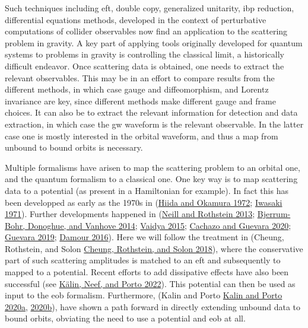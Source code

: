 \documentclass[
  11pt,
  a4paper,
  DIV=11,
  numbers=noendperiod,
  oneside]{scrreprt}
\DeclareRobustCommand{\[}{\begin{equation}}
\DeclareRobustCommand{\]}{\end{equation}}
\begin{document}
Such techniques including \gls{eft}, double copy, generalized unitarity,
\gls{ibp} reduction, differential equations methods, developed in the
context of perturbative computations of collider observables now find an
application to the scattering problem in gravity. A key part of applying
tools originally developed for quantum systems to problems in gravity is
controlling the classical limit, a historically difficult endeavor. Once
scattering data is obtained, one needs to extract the relevant
observables. This may be in an effort to compare results from the
different methods, in which case gauge and diffeomorphism, and Lorentz
invariance are key, since different methods make different gauge and
frame choices. It can also be to extract the relevant information for
detection and data extraction, in which case the \gls{gw} waveform is
the relevant observable. In the latter case one is mostly interested in
the orbital waveform, and thus a map from unbound to bound orbits is
necessary.

Multiple formalisms have arisen to map the scattering problem to an
orbital one, and the quantum formalism to a classical one. One key way
is to map scattering data to a potential (as present in a Hamiltonian
for example). In fact this has been developped as early as the 1970s in
(\protect\hyperlink{ref-Hiida:1972xs}{Hiida and Okamura 1972};
\protect\hyperlink{ref-Iwasaki:1971vb}{Iwasaki 1971}). Further
developments happened in (\protect\hyperlink{ref-Neill:2013wsa}{Neill
and Rothstein 2013};
\protect\hyperlink{ref-Bjerrum-Bohr:2013bxa}{Bjerrum-Bohr, Donoghue, and
Vanhove 2014}; \protect\hyperlink{ref-Vaidya:2014kza}{Vaidya 2015};
\protect\hyperlink{ref-Cachazo:2017jef}{Cachazo and Guevara 2020};
\protect\hyperlink{ref-Guevara:2017csg}{Guevara 2019};
\protect\hyperlink{ref-Damour:2016gwp}{Damour 2016}). Here we will
follow the treatment in (Cheung, Rothstein, and Solon
\protect\hyperlink{ref-Cheung:2018wkq}{Cheung, Rothstein, and Solon
2018}), where the conservative part of such scattering amplitudes is
matched to an \gls{eft} and subsequently to mapped to a potential.
Recent efforts to add dissipative effects have also been successful (see
\protect\hyperlink{ref-Kalin:2022hph}{Kälin, Neef, and Porto 2022}).
This potential can then be used as input to the \gls{eob} formalism.
Furthermore, (Kalin and Porto
\protect\hyperlink{ref-Kalin:2019rwq}{Kalin and Porto 2020a},
\protect\hyperlink{ref-Kalin:2019inp}{2020b}), have shown a path forward
in directly extending unbound data to bound orbits, obviating the need
to use a potential and \gls{eob} at all.
\end{document}
